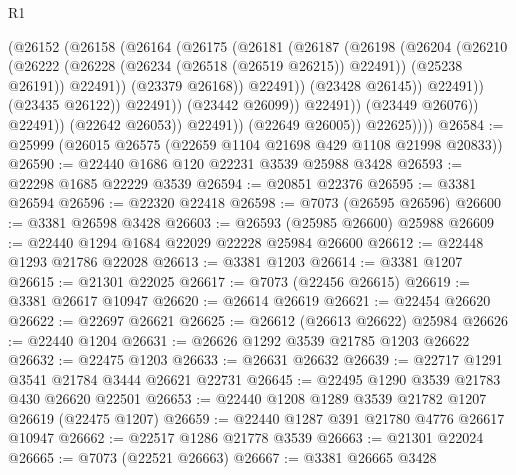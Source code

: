 \begin{lexlean}{R1}
\begin{coremodule}
                                    (@26152
                                      (@26158
                                        (@26164
                                          (@26175
                                            (@26181
                                              (@26187
                                                (@26198
                                                  (@26204
                                                    (@26210
                                                      (@26222
                                                        (@26228
                                                          (@26234 (@26518 (@26519 @26215)) @22491))
                                                        (@25238 @26191))
                                                      @22491))
                                                  (@23379 @26168))
                                                @22491))
                                            (@23428 @26145))
                                          @22491))
                                      (@23435 @26122))
                                    @22491))
                                (@23442 @26099))
                              @22491))
                          (@23449 @26076))
                        @22491))
                    (@22642 @26053))
                  @22491))
              (@22649 @26005))
            @22625))))
@26584 := @25999 (@26015 @26575 (@22659 @1104 @21698 @429 @1108 @21998 @20833))
@26590 := @22440 @1686 @120 @22231 @3539 @25988 @3428
@26593 := @22298 @1685 @22229 @3539
@26594 := @20851 @22376
@26595 := @3381 @26594
@26596 := @22320 @22418
@26598 := @7073 (@26595 @26596)
@26600 := @3381 @26598 @3428
@26603 := @26593 (@25985 @26600) @25988
@26609 := @22440 @1294 @1684 @22029 @22228 @25984 @26600
@26612 := @22448 @1293 @21786 @22028
@26613 := @3381 @1203
@26614 := @3381 @1207
@26615 := @21301 @22025
@26617 := @7073 (@22456 @26615)
@26619 := @3381 @26617 @10947
@26620 := @26614 @26619
@26621 := @22454 @26620
@26622 := @22697 @26621
@26625 := @26612 (@26613 @26622) @25984
@26626 := @22440 @1204
@26631 := @26626 @1292 @3539 @21785 @1203 @26622
@26632 := @22475 @1203
@26633 := @26631 @26632
@26639 := @22717 @1291 @3541 @21784 @3444 @26621 @22731
@26645 := @22495 @1290 @3539 @21783 @430 @26620 @22501
@26653 := @22440 @1208 @1289 @3539 @21782 @1207 @26619 (@22475 @1207)
@26659 := @22440 @1287 @391 @21780 @4776 @26617 @10947
@26662 := @22517 @1286 @21778 @3539
@26663 := @21301 @22024
@26665 := @7073 (@22521 @26663)
@26667 := @3381 @26665 @3428

\end{coremodule}
\end{lexlean}
